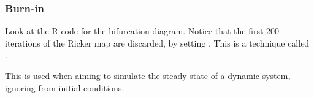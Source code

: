 \documentclass{beamer}\usepackage[]{graphicx}\usepackage[]{color}
\begin{document}
\begin{frame}[fragile]

\frametitle{Burn-in}

\bi

\item Look at the R code for the bifurcation diagram. Notice that the first 200 iterations of the Ricker map are discarded, by setting . This is a technique called . 

\item This is used when aiming to simulate the steady state of a dynamic system, ignoring  from initial conditions.



\ei


\end{frame}    
\end{document}
